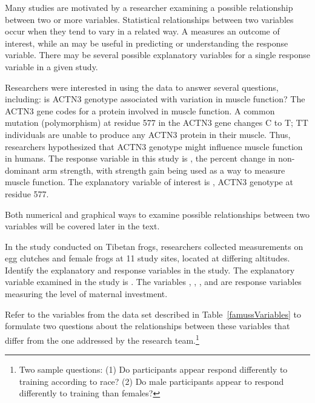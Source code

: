 \begin{doublespace}
Many studies are motivated by a researcher examining a possible relationship between two or more variables. Statistical relationships between two variables occur when they tend to vary in a related way. A  measures an outcome of interest, while an  may be useful in predicting or understanding the response variable. There may be several possible explanatory variables for a single response variable in a given study.

Researchers were interested in using the  data to answer several questions, including: is ACTN3 genotype associated with variation in muscle function? The ACTN3 gene codes for a protein involved in muscle function. A common mutation (polymorphism) at residue 577 in the ACTN3 gene changes C to T; TT individuals are unable to produce any ACTN3 protein in their muscle. Thus, researchers hypothesized that ACTN3 genotype might influence muscle function in humans. The response variable in this study is , the percent change in non-dominant arm strength, with strength gain being used as a way to measure muscle function. The explanatory variable of interest is , ACTN3 genotype at residue 577.  

Both numerical and graphical ways to examine possible relationships between two variables will be covered later in the text.

\begin{example}{In the study conducted on Tibetan frogs, researchers collected measurements on egg clutches and female frogs at 11 study sites, located at differing altitudes. Identify the explanatory and response variables in the study.}
The explanatory variable examined in the study is . The variables , , , and  are response variables measuring the level of maternal investment. 
\end{example}	

\begin{exercise}
Refer to the variables from the  data set described in Table~\ref{famussVariables} to formulate two questions about the relationships between these variables that differ from the one addressed by the research team.\footnote{Two sample questions: (1)  Do participants appear respond differently to training according to race?  (2)  Do male participants appear to respond differently to training than females?}
\end{exercise}




\end{doublespace}
